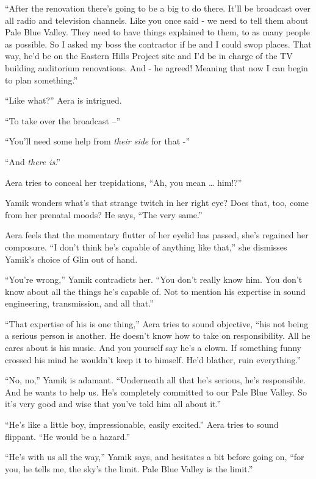 \documentclass[twoside,11pt]{book}
\begin{document}
``After the renovation there's going to be a big to do there. It'll be broadcast over all radio and
television channels. Like you once said - we need to tell them about Pale Blue Valley. They need to have things
explained to them, to as many people as possible. So I asked my boss the contractor if he and I could swop places.
That way, he'd be on the Eastern Hills Project site and I'd be in charge of the TV building auditorium renovations. And
- he agreed! Meaning that now I can begin to plan something.''

``Like what?'' Aera is intrigued.

``To take over the broadcast --''

``You'll need some help from \textit{their side }for that -''

``And \textit{there is}.''

Aera tries to conceal her trepidations, ``Ah, you mean {\dots} him!?''

Yamik wonders what's that strange twitch in her right eye? Does that, too, come from her prenatal moods? He says,
``The very same.''

Aera feels that the momentary flutter of her eyelid has passed, she's regained her composure. ``I don't
think he's capable of anything like that,'' she dismisses Yamik's choice of Glin out of hand.

``You're wrong,'' Yamik contradicts her. ``You don't really know him. You don't
know about all the things he's capable of. Not to mention his expertise in sound engineering, transmission, and all
that.''

``That expertise of his is one thing,'' Aera tries to sound objective, ``his not
being a serious person is another. He doesn't know how to take on responsibility. All he cares about is his music.
And you yourself say he's a clown. If something funny crossed his mind he wouldn't keep it to himself. He'd blather,
ruin everything.''

``No, no,'' Yamik is adamant. ``Underneath all that he's serious, he's
responsible. And he wants to help us. He's completely committed to our Pale Blue Valley. So it's very good and wise
that you've told him all about it.''

``He's like a little boy, impressionable, easily excited.'' Aera tries to sound flippant.
``He would be a hazard.''

``He's with us all the way,'' Yamik says, and hesitates a bit before going on,
``for you, he tells me, the sky's the limit. Pale Blue Valley is the limit.''
\end{document}
